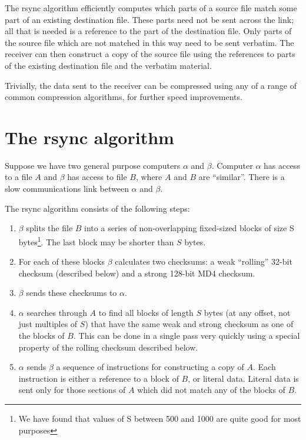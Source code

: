 \documentclass[a4paper]{article}
\begin{document}
The rsync algorithm efficiently computes which parts of a source file
match some part of an existing destination file.  These parts need not
be sent across the link; all that is needed is a reference to the part
of the destination file.  Only parts of the source file which are not
matched in this way need to be sent verbatim.  The receiver can then
construct a copy of the source file using the references to parts of
the existing destination file and the verbatim material.

Trivially, the data sent to the receiver can be compressed using any
of a range of common compression algorithms, for further speed
improvements.

\section{The rsync algorithm}

Suppose we have two general purpose computers $\alpha$ and $\beta$.
Computer $\alpha$ has access to a file $A$ and $\beta$ has access to
file $B$, where $A$ and $B$ are ``similar''.  There is a slow
communications link between $\alpha$ and $\beta$.

The rsync algorithm consists of the following steps:

\begin{enumerate}
\item $\beta$ splits the file $B$ into a series of non-overlapping
  fixed-sized blocks of size S bytes\footnote{We have found that
  values of S between 500 and 1000 are quite good for most purposes}.
  The last block may be shorter than $S$ bytes.

\item For each of these blocks $\beta$ calculates two checksums:
  a weak ``rolling'' 32-bit checksum (described below) and a strong
  128-bit MD4 checksum.

\item $\beta$ sends these checksums to $\alpha$.

\item $\alpha$ searches through $A$ to find all blocks of length $S$
  bytes (at any offset, not just multiples of $S$) that have the same
  weak and strong checksum as one of the blocks of $B$. This can be
  done in a single pass very quickly using a special property of the
  rolling checksum described below.

\item $\alpha$ sends $\beta$ a sequence of instructions for
  constructing a copy of $A$.  Each instruction is either a reference
  to a block of $B$, or literal data.  Literal data is sent only for
  those sections of $A$ which did not match any of the blocks of $B$.
\end{enumerate}
\end{document}
